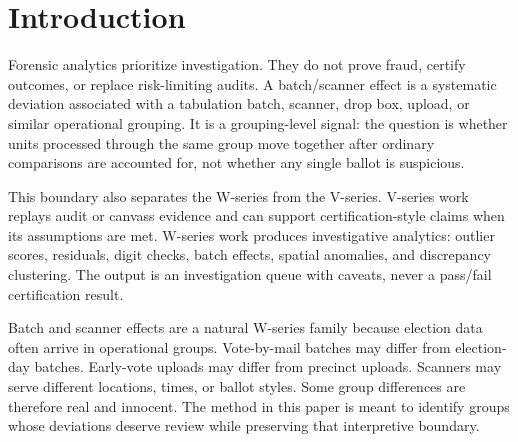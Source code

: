 \section{Introduction}

Forensic analytics prioritize investigation. They do not prove fraud, certify
outcomes, or replace risk-limiting audits. A batch/scanner effect is a
systematic deviation associated with a tabulation batch, scanner, drop box,
upload, or similar operational grouping. It is a grouping-level signal: the
question is whether units processed through the same group move together after
ordinary comparisons are accounted for, not whether any single ballot is
suspicious.

This boundary also separates the W-series from the V-series. V-series work
replays audit or canvass evidence and can support certification-style claims
when its assumptions are met. W-series work produces investigative analytics:
outlier scores, residuals, digit checks, batch effects, spatial anomalies, and
discrepancy clustering. The output is an investigation queue with caveats, never
a pass/fail certification result.

Batch and scanner effects are a natural W-series family because election data
often arrive in operational groups. Vote-by-mail batches may differ from
election-day batches. Early-vote uploads may differ from precinct uploads.
Scanners may serve different locations, times, or ballot styles. Some group
differences are therefore real and innocent. The method in this paper is meant
to identify groups whose deviations deserve review while preserving that
interpretive boundary.
